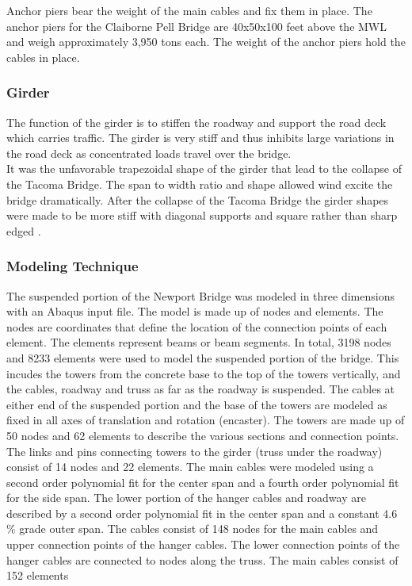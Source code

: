 Anchor piers bear the weight of the main cables and fix them in place. The anchor piers for the Claiborne Pell Bridge are 40x50x100 feet above the MWL and
weigh approximately 3,950 tons each. The weight of the anchor piers hold the cables in place. 

\subsubsection{Girder}

The function of the girder is to stiffen the roadway and support the road deck which carries traffic. The girder is very stiff and thus inhibits large
variations in the road deck as concentrated loads travel over the bridge.\\ 
\indent It was the unfavorable trapezoidal shape of the girder that lead to the collapse of the Tacoma Bridge. The span to width ratio and shape allowed
wind excite the bridge dramatically. After the collapse of the Tacoma Bridge the girder shapes were made to be more stiff with diagonal supports and
square rather than sharp edged \cite{Manoj}. 

\subsubsection{Modeling Technique}

The suspended portion of the Newport Bridge was modeled in three dimensions with an Abaqus input file. 
The model is made up of nodes and elements. The nodes are coordinates that define the location of the connection points of each element. 
The elements represent beams or beam segments. In total, 3198 nodes and 8233 elements were used to model the suspended portion of the bridge. 
This incudes the towers from the concrete base to the top of the towers vertically, and the cables, roadway and truss as far as the roadway is suspended. 
The cables at either end of the suspended portion and the base of the towers are modeled as fixed in all axes of translation and rotation (encaster).
The towers are made up of 50 nodes and 62 elements to describe the various sections and connection points. 
The links and pins connecting towers to the girder (truss under the roadway) consist of 14 nodes and 22 elements. 
The main cables were modeled using a second order polynomial fit for the center span and a fourth order polynomial fit for the side span. 
The lower portion of the hanger cables and roadway are described by a second order polynomial fit in the center span and a constant 4.6 \% grade outer span. 
The cables consist of 148 nodes for the main cables and upper connection points of the hanger cables.
The lower connection points of the hanger cables are connected to nodes along the truss. The main cables consist of 152 elements 


